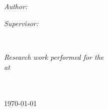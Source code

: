 \documentclass[
11pt, %
english, %
singlespacing, %
headsepline, %
]{MastersDoctoralThesis} %
\begin{document}
\begin{titlepage}
\begin{center}
\HRule \\[0.4cm] %
{\huge \bfseries \ttitle\par}\vspace{0.4cm} %
\HRule \\[1.5cm] %
 
\begin{minipage}[t]{0.4\textwidth}
\begin{flushleft} \large
\emph{Author:}\\
\href{https://en.wikipedia.org/wiki/Ludwig_Boltzmann}{\authorname} %
\end{flushleft}
\end{minipage}
\begin{minipage}[t]{0.4\textwidth}
\begin{flushright} \large
\emph{Supervisor:} \\
\href{https://en.wikipedia.org/wiki/Josef_Stefan}{\supname} %
\end{flushright}
\end{minipage}\\[3cm]
 
\vfill

\large \textit{Research work performed for the \degreename}\\[0.3cm] %
\textit{at}\\[0.4cm]
\groupname\\\deptname\\[2cm] %
 
\vfill

{\small \today}\\[4cm] %
 
\vfill
\end{center}
\end{titlepage}



\pagestyle{review} 


%
\end{document}
